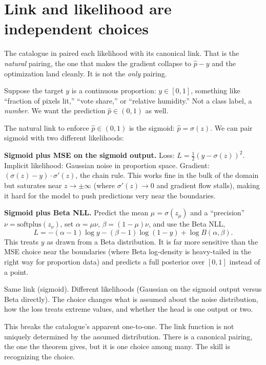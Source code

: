 
\section{Link and likelihood are independent choices}\label{sec:link-likelihood}

The catalogue in  paired each likelihood with its
canonical link. That is the \emph{natural} pairing, the one that makes
the gradient collapse to $\hat{p} - y$ and the optimization land
cleanly. It is not the \emph{only} pairing.

Suppose the target $y$ is a continuous proportion: $y \in [0, 1]$,
something like ``fraction of pixels lit,'' ``vote share,'' or ``relative
humidity.'' Not a class label, a \emph{number}. We want the prediction
$\hat{p} \in (0, 1)$ as well.

The natural link to enforce $\hat{p} \in (0, 1)$ is the sigmoid:
$\hat{p} = \sigma(z)$. We can pair sigmoid with two different
likelihoods:

\textbf{Sigmoid plus MSE on the sigmoid output.} Loss:
$L = \tfrac{1}{2}(y - \sigma(z))^2$. Implicit likelihood: Gaussian
noise in proportion space. Gradient: $(\sigma(z) - y) \cdot \sigma'(z)$,
the chain rule. This works fine in the bulk of the domain but saturates
near $z \to \pm\infty$ (where $\sigma'(z) \to 0$ and gradient flow
stalls), making it hard for the model to push predictions very near the
boundaries.

\textbf{Sigmoid plus Beta NLL.} Predict the mean
$\mu = \sigma(z_\mu)$ and a ``precision'' $\nu = \mathrm{softplus}(z_\nu)$,
set $\alpha = \mu\nu$, $\beta = (1 - \mu)\nu$, and use the Beta NLL,
\[
  L = -(\alpha - 1)\log y - (\beta - 1)\log(1 - y) + \log B(\alpha, \beta).
\]
This treats $y$ as drawn from a Beta distribution. It is far more
sensitive than the MSE choice near the boundaries (where Beta
log-density is heavy-tailed in the right way for proportion data) and
predicts a full posterior over $[0, 1]$ instead of a point.

Same link (sigmoid). Different likelihoods (Gaussian on the sigmoid
output versus Beta directly). The choice changes what is assumed about
the noise distribution, how the loss treats extreme values, and whether
the head is one output or two.

This breaks the catalogue's apparent one-to-one. The link function is
not uniquely determined by the assumed distribution. There is a canonical
pairing, the one the theorem gives, but it is one choice among many.
The skill is recognizing the choice.

